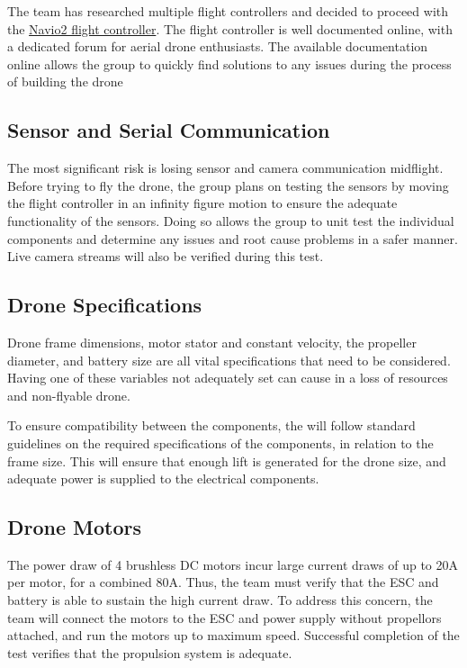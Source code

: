 \documentclass{article}
\begin{document}
The team has researched multiple flight controllers and decided to proceed with the \href{https://navio2.emlid.com/}{Navio2 flight controller}. The flight controller is well documented online, with a dedicated forum for aerial drone enthusiasts.  The available documentation online allows the group to quickly find solutions to any issues during the process of building the drone
\subsection{Sensor and Serial Communication}
The most significant risk is losing sensor and camera communication midflight. Before trying to fly the drone, the group plans on testing the sensors by moving the flight controller in an infinity figure motion to ensure the adequate functionality of the sensors. Doing so allows the group to unit test the individual components and determine any issues and root cause problems in a safer manner. Live camera streams will also be verified during this test.

\subsection{Drone Specifications}
Drone frame dimensions, motor stator and constant velocity, the propeller diameter, and battery size are all vital specifications that need to be considered. Having one of these variables not adequately set can cause in a loss of resources and non-flyable drone.

To ensure compatibility between the components, the will follow standard guidelines on the required specifications of the components, in relation to the frame size. This will ensure that enough lift is generated for the drone size, and adequate power is supplied to the electrical components.

\subsection{Drone Motors}
The power draw of 4 brushless DC motors incur large current draws of up to 20A per motor, for a combined 80A. Thus, the team must verify that the ESC and battery is able to sustain the high current draw. To address this concern, the team will connect the motors to the ESC and power supply without propellors attached, and run the motors up to maximum speed. Successful completion of the test verifies that the propulsion system is adequate.

\clearpage
\end{document}
